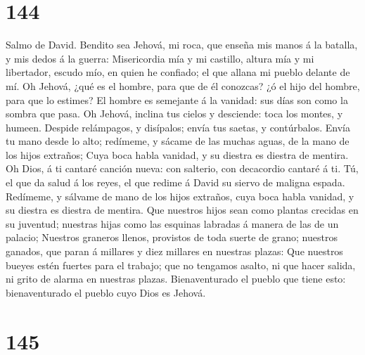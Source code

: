 \hypertarget{section-143}{%
\section{144}\label{section-143}}

 Salmo de David. Bendito sea Jehová, mi roca, que enseña
mis manos á la batalla, y mis dedos á la guerra: 
Misericordia mía y mi castillo, altura mía y mi libertador, escudo mío,
en quien he confiado; el que allana mi pueblo delante de mí.
 Oh Jehová, ¿qué es el hombre, para que de él conozcas? ¿ó
el hijo del hombre, para que lo estimes?  El hombre es
semejante á la vanidad: sus días son como la sombra que pasa.
 Oh Jehová, inclina tus cielos y desciende: toca los
montes, y humeen.  Despide relámpagos, y disípalos; envía
tus saetas, y contúrbalos.  Envía tu mano desde lo alto;
redímeme, y sácame de las muchas aguas, de la mano de los hijos
extraños;  Cuya boca habla vanidad, y su diestra es
diestra de mentira.  Oh Dios, á ti cantaré canción nueva:
con salterio, con decacordio cantaré á ti.  Tú, el que da
salud á los reyes, el que redime á David su siervo de maligna espada.
 Redímeme, y sálvame de mano de los hijos extraños, cuya
boca habla vanidad, y su diestra es diestra de mentira. 
Que nuestros hijos sean como plantas crecidas en su juventud; nuestras
hijas como las esquinas labradas á manera de las de un palacio;
 Nuestros graneros llenos, provistos de toda suerte de
grano; nuestros ganados, que paran á millares y diez millares en
nuestras plazas:  Que nuestros bueyes estén fuertes para
el trabajo; que no tengamos asalto, ni que hacer salida, ni grito de
alarma en nuestras plazas.  Bienaventurado el pueblo que
tiene esto: bienaventurado el pueblo cuyo Dios es Jehová.

\hypertarget{section-144}{%
\section{145}\label{section-144}}

